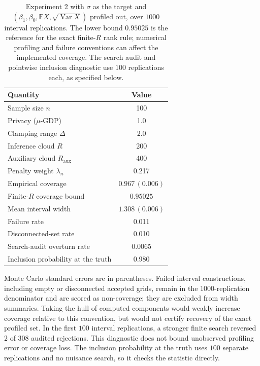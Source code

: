 \begin{table}[!htbp]
\centering
\caption{Experiment 2 with $\sigma$ as the target and
$(\beta_1,\beta_0,\mathbb{E}X,\sqrt{\operatorname{Var}X})$ profiled out,
over $1000$ interval replications. The lower bound $0.95025$ is the
reference for the exact finite-$R$ rank rule; numerical profiling and
failure conventions can affect the implemented coverage. The search audit
and pointwise inclusion diagnostic use $100$ replications each, as
specified below.}
\label{tab:exp2-sigma}
\small
\begin{tabular}{lc}
\toprule
Quantity & Value \\
\midrule
Sample size $n$ & 100 \\
Privacy ($\mu$-GDP) & 1.0 \\
Clamping range $\Delta$ & 2.0 \\
Inference cloud $R$ & 200 \\
Auxiliary cloud $R_{\mathrm{aux}}$ & 400 \\
Penalty weight $\lambda_n$ & 0.217 \\[2pt]
Empirical coverage & $0.967\,(0.006)$ \\
Finite-$R$ coverage bound & $0.95025$ \\
Mean interval width & $1.308\,(0.006)$ \\
Failure rate & 0.011 \\
Disconnected-set rate & 0.010 \\[2pt]
Search-audit overturn rate & 0.0065 \\
Inclusion probability at the truth & 0.980 \\
\bottomrule
\end{tabular}

\vspace{2pt}
\begin{minipage}{.94\linewidth}\footnotesize
Monte Carlo standard errors are in parentheses. Failed interval
constructions, including empty or disconnected accepted grids, remain in
the $1000$-replication denominator and are scored as non-coverage; they
are excluded from width summaries. Taking the hull of computed components
would weakly increase coverage relative to this convention, but would not
certify recovery of the exact profiled set. In the first $100$ interval
replications, a stronger finite search reversed $2$ of $308$ audited
rejections. This diagnostic does not bound unobserved profiling error or
coverage loss. The inclusion probability at the truth uses $100$ separate
replications and no nuisance search, so it checks the statistic directly.
\end{minipage}
\end{table}
